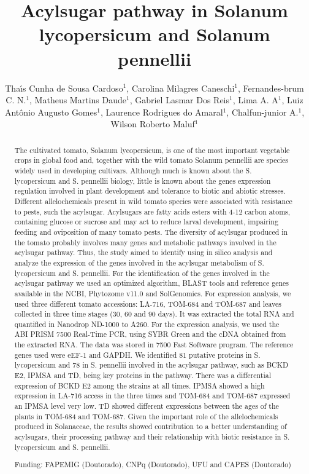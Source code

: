 \documentclass[twoside]{article}
\title{\vspace{-15mm}\fontsize{24pt}{10pt}\selectfont\textbf{Acylsugar pathway in Solanum lycopersicum and Solanum pennellii}} %
\author{Tha\'{\i}s Cunha de Sousa Cardoso$^1$, Carolina Milagres Caneschi$^1$, Fernandes-brum C. N.$^1$, Matheus Martins Daude$^1$, Gabriel Lasmar Dos Reis$^1$, Lima A. A$^1$, Luiz Ant\^onio Augusto Gomes$^1$, Laurence Rodrigues do Amaral$^1$, Chalfun-junior A.$^1$, Wilson Roberto Maluf$^1$}
\affil{1 UFU\\ }
\date{}
\begin{document}
\maketitle %

\thispagestyle{fancy} %


\begin{abstract}
The cultivated tomato, Solanum lycopersicum, is one of the most important vegetable crops in global food and, together with the wild tomato Solanum pennellii are species widely used in developing cultivars. Although much is known about the S. lycopersicum and S. pennellii biology, little is known about the genes expression regulation involved in plant development and tolerance to biotic and abiotic stresses. Different allelochemicals present in wild tomato species were associated with resistance to pests, such the acylsugar. Acylsugars are fatty acids esters with 4-12 carbon atoms, containing glucose or sucrose and may act to reduce larval development, impairing feeding and oviposition of many tomato pests. The diversity of acylsugar produced in the tomato probably involves many genes and metabolic pathways involved in the acylsugar pathway. Thus, the study aimed to identify using in silico analysis and analyze the expression of the genes involved in the acylsugar metabolism of S. lycopersicum and S. pennellii. For the identification of the genes involved in the acylsugar pathway we used an optimized algorithm, BLAST tools and reference genes available in the NCBI, Phytozome v11.0 and SolGenomics. For expression analysis, we used three different tomato accessions: LA-716, TOM-684 and TOM-687 and leaves collected in three time stages (30, 60 and 90 days). It was extracted the total RNA and quantified in Nanodrop\textsuperscript{\textcopyright} ND-1000 to A260. For the expression analysis, we used the ABI PRISM 7500 Real-Time PCR, using SYBR Green and the cDNA obtained from the extracted RNA. The data was stored in 7500 Fast Software program. The reference genes used were eEF-1 and GAPDH. We identified 81 putative proteins in S. lycopersicum and 78 in S. pennellii involved in the acylsugar pathway, such as BCKD E2, IPMSA and TD, being key proteins in the pathway. There was a differential expression of BCKD E2 among the strains at all times. IPMSA showed a high expression in LA-716 access in the three times and TOM-684 and TOM-687 expressed an IPMSA level very low. TD showed different expressions between the ages of the plants in TOM-684 and TOM-687. Given the important role of the allelochemicals produced in Solanaceae, the results showed contribution to a better understanding of acylsugars, their processing pathway and their relationship with biotic resistance in S. lycopersicum and S. pennellii.

Funding: FAPEMIG (Doutorado), CNPq (Doutorado), UFU and CAPES (Doutorado)
\end{abstract}
\end{document}
